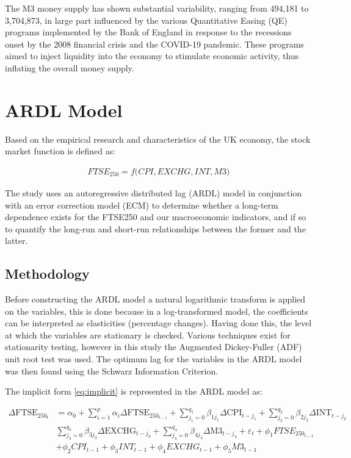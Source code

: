 \documentclass[11pt,a4paper]{article}
\begin{document}
The M3 money supply has shown substantial variability, ranging from 494,181 to 3,704,873, 
in large part influenced by the various Quantitative Easing (QE) programs implemented by the Bank of England 
in response to the recessions onset by the 2008 financial crisis and the COVID-19 pandemic. These programs aimed to inject liquidity into the economy to stimulate economic activity, thus inflating the overall money supply.

\section{ARDL Model}

Based on the empirical research and characteristics of the UK economy,
the stock market function is defined as:

\begin{align}
    FTSE_{250} = f\biggl(CPI, EXCHG, INT, M3\biggr) \label{eq:implicit}
\end{align}

The study uses an autoregressive distributed lag (ARDL) model in conjunction with 
an error correction model (ECM) to determine 
whether a long-term dependence exists for the FTSE250 and our macroeconomic 
indicators, and if so to quantify the long-run and short-run relationships
between the former and the latter. 

\subsection{Methodology}

Before constructing the ARDL model a natural logarithmic transform is applied
on the variables, this is done because in a log-transformed model,
the coefficients can be interpreted as elasticities (percentage changes). Having done this,
the level at which the variables are stationary is checked.
Various techniques exist for stationarity testing, however in this study the 
Augmented Dickey-Fuller (ADF) unit root test was used. The optimum lag for the variables in the ARDL model was then found using the Schwarz
Information Criterion.

The implicit form \eqref{eq:implicit} is represented in the ARDL model as:

\begin{align*}
    \Delta \text{FTSE}_{250_t} &= \alpha_0 + \sum_{i=1}^{p} \alpha_i \Delta \text{FTSE}_{250_{t-i}} + \sum_{j_{1}=0}^{q_1} \beta_{1j_{1}} \Delta \text{CPI}_{t-j_{1}} + \sum_{j_{2}=0}^{q_2} \beta_{2j_{2}} \Delta \text{INT}_{t-j_{2}} \\
                               & \sum_{j_{3}=0}^{q_3} \beta_{3j_{3}} \Delta \text{EXCHG}_{t-j_{3}} + \sum_{j_{4}=0}^{q_4} \beta_{4j_{4}} \Delta \text{M3}_{t-j_{4}} + \varepsilon_t + \phi_{1} FTSE_{250_{t-1}} \\
                               & + \phi_{2} CPI_{t-1} + \phi_{3} INT_{t-1} +\phi_4 EXCHG_{t-1} + \phi_5 M3_{t-1}
\end{align*}
\end{document}
